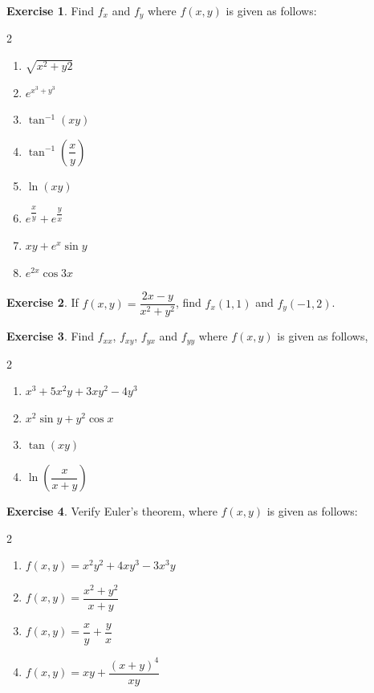 \documentclass[../../main.tex]{subfiles}
\theoremstyle{definition}
\newtheorem{exercise}{Exercise}[section]
\begin{document}
\begin{exercise}
Find $f_x$ and $f_y$ where $f(x,y)$ is given as follows:
\begin{multicols}{2}
\begin{enumerate}[label=(\roman*)]
    \item $\sqrt{x^2+y2}$
    \item $e^{x^3+y^3}$
    \item $\tan^{-1}(xy)$
    \item $\tan^{-1}(\dfrac{x}{y})$
    \item $\ln(xy)$
    \item $e^{\dfrac{x}{y}}+e^{\dfrac{y}{x}}$
    \item $xy+e^x\sin y$
    \item $e^{2x}\cos 3x$
\end{enumerate}
\end{multicols}
\end{exercise}


\begin{exercise}
If $f(x,y)=\dfrac{2x-y}{x^2+y^2}$, find $f_x(1,1)$ and $f_y(-1,2)$.
\end{exercise}

\begin{exercise}
Find $f_{xx}$, $f_{xy}$, $f_{yx}$ and $f_{yy}$ where $f(x,y)$ is given as follows,
\begin{multicols}{2}
\begin{enumerate}[label=(\roman*)]
    \item $x^3+5x^2y+3xy^2-4y^3$
    \item $x^2\sin y+y^2\cos x$
    \item $\tan (xy)$
    \item $\ln (\dfrac{x}{x+y})$
\end{enumerate}
\end{multicols}
\end{exercise}


\begin{exercise}
Verify Euler's theorem, where $f(x,y)$ is given as follows:
\begin{multicols}{2}
\begin{enumerate}[label=(\roman*)]
    \item $f(x,y)=x^2y^2+4xy^3-3x^3y$
    \item $f(x,y)=\dfrac{x^2+y^2}{x+y}$
    \item $f(x,y)=\dfrac{x}{y}+\dfrac{y}{x}$
    \item $f(x,y)=xy+\dfrac{(x+y)^4}{xy}$ 
\end{enumerate}
\end{multicols}    
\end{exercise}
\end{document}
